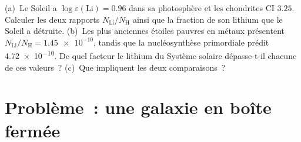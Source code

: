 \begin{exercise}[$\star\star\star$]\label{exo:b3:origin-of-elements:12}
(a)~Le Soleil a $\log\varepsilon(\mathrm{Li}) = 0.96$ dans sa photosphère
et les chondrites CI $3.25$. Calculer les deux rapports $N_\mathrm{Li}/N_\mathrm{H}$
ainsi que la fraction de son lithium que le Soleil a détruite. (b)~Les plus
anciennes étoiles pauvres en métaux présentent $N_\mathrm{Li}/N_\mathrm{H} = \num{1.45e-10}$,
tandis que la nucléosynthèse primordiale prédit \num{4.72e-10}. De quel facteur
le lithium du Système solaire dépasse-t-il chacune de ces valeurs~? (c)~Que
impliquent les deux comparaisons~?
\end{exercise}

\section{Problème~: une galaxie en boîte fermée}

